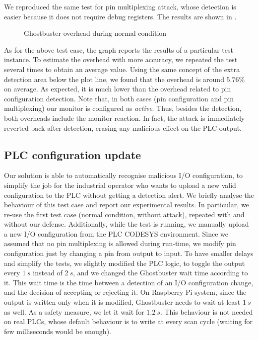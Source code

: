 We reproduced the same test for pin multiplexing attack, whose detection is easier because it does not require debug registers.
The results are shown in .
\begin{figure}[h]
\centering
{}
\caption{Ghostbuster overhead during normal condition}
\label{fig:pinmux-overhead}
\end{figure}
As for the above test case, the graph reports the results of a particular test instance. 
To estimate the overhead with more accuracy, we repeated the test several times to obtain an average value.
Using the same concept of the extra detection area below the plot line, we found that the overhead is around $5.76\%$ on average.
As expected, it is much lower than the overhead related to pin configuration detection.
Note that, in both cases (pin configuration and pin multiplexing) our monitor is configured as \emph{active}.
Thus, besides the detection, both overheads include the monitor reaction.
In fact, the attack is immediately reverted back after detection, erasing any malicious effect on the PLC output.


\subsection{PLC configuration update}

Our solution is able to automatically recognise malicious I/O configuration, to simplify the job for the industrial operator who wants to upload a new valid configuration to the PLC
without getting a detection alert. We briefly analyse the behaviour of this test case and report our experimental results.
In particular, we re-use the first test case (normal condition, without attack), repeated with and without our defense.
Additionally, while the test is running, we manually upload a new I/O configuration from the PLC CODESYS environment.
Since we assumed that no pin multiplexing is allowed during run-time, we modify pin configuration just by changing a pin from output to input.
To have smaller delays and simplify the tests, we slightly modified the PLC logic, to toggle the output every $\SI{1}{s}$ instead of $\SI{2}{s}$,
and we changed the Ghostbuster wait time according to it. This wait time is the time between a detection of an I/O configuration change, and the decision of accepting or rejecting it.
On Raspberry Pi system, since the output is written only when it is modified, Ghostbuster needs to wait at least $\SI{1}{s}$ as well.
As a safety measure, we let it wait for $\SI{1.2}{s}$. This behaviour is not needed on real PLCs, whose default behaviour is to write at every scan cycle
(\ie waiting for few milliseconds would be enough).

